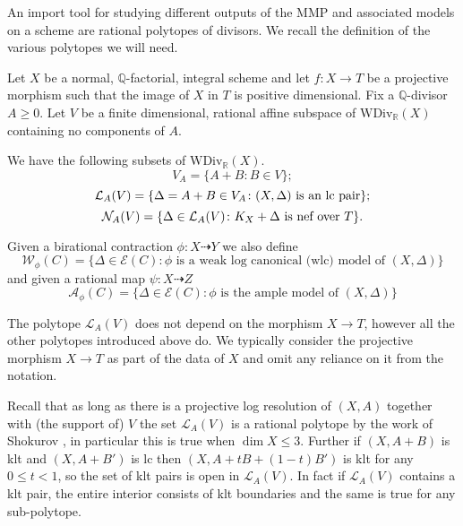 An import tool for studying different outputs of the MMP and associated models on a scheme are rational polytopes of divisors. We recall the definition of the various polytopes we will need.

\begin{definition}
	Let  $X$ be a normal, $\mathbb{Q}$-factorial, integral scheme and let $f \colon X \to T$ be a projective morphism such that the image of $X$ in $T$ is positive dimensional. 
	Fix a $\mathbb{Q}$-divisor $A\geq 0$. Let $V$ be a finite dimensional, rational affine subspace of $\text{WDiv}_{\mathbb{R}}(X)$ containing no components of $A$.
	
	We have the following subsets of $\text{WDiv}_\mathbb{R}(X)$.
	\[V_{A}= \{A+B \colon B \in V\};\]
	\[\mathcal{L}_{A}(V)=\{\Delta=A+B \in V_{A} \colon (X,\Delta) \textup{ is an lc pair}\};\]
	\[\mathcal{N}_{A}(V)=\{\Delta \in \mathcal{L}_{A}(V) \colon K_{X}+\Delta \textup{ is nef over } T\}.\]
	
	Given a birational contraction $\phi\colon X \dashrightarrow Y$ we also define
	\[\mathcal{W}_{\phi}(C)=\{\Delta \in \mathcal{E}(C): \phi \text{ is a weak log canonical (wlc) model of } (X,\Delta)\}\]
	and given a rational map $\psi\colon X \dashrightarrow Z$
	\[\mathcal{A}_{\phi}(C)=\{\Delta \in \mathcal{E}(C): \phi \text{ is the ample model of } (X,\Delta)\}\]
\end{definition}

\begin{remark}
	
	The polytope $\mathcal{L}_{A}(V)$ does not depend on the morphism $X \to T$, however all the other polytopes introduced above do. We typically consider the projective morphism $X \to T$ as part of the data of $X$ and omit any reliance on it from the notation.
	
	\end{remark}

Recall that as long as there is a projective log resolution of $(X,A)$ together with (the support of) $V$ the set $\mathcal{L}_{A}(V)$ is a rational polytope by the work of Shokurov \cite{Sho92}, in particular this is true when $\dim X \leq 3$. Further if $(X,A+B)$ is klt and $(X,A+B')$ is lc then $(X,A+tB+(1-t)B')$ is klt for any $0 \leq t < 1$, so the set of klt pairs is open in $\mathcal{L}_{A}(V)$. In fact if $\mathcal{L}_{A}(V)$ contains a klt pair, the entire interior consists of klt boundaries and the same is true for any sub-polytope.

